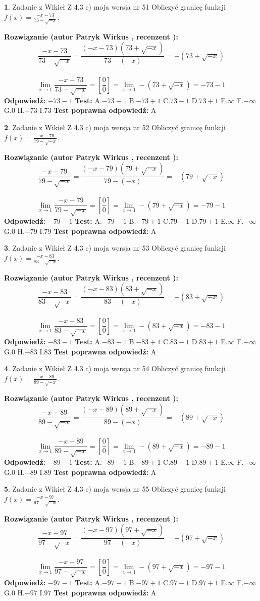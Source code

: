 \documentclass[12pt, a4paper]{article}
\theoremstyle{definition} %
\newtheorem{zad}{}
\newcommand{\zadStart}[1]{\begin{zad}#1\newline}
\newcommand{\zadStop}{\end{zad}}
\newcommand{\rozwStart}[2]{\noindent \textbf{Rozwiązanie (autor #1 , recenzent #2): }\newline}
\newcommand{\rozwStop}{\newline}
\newcommand{\odpStart}{\noindent \textbf{Odpowiedź:}\newline}
\newcommand{\odpStop}{\newline}
\newcommand{\testStart}{\noindent \textbf{Test:}\newline}
\newcommand{\testStop}{\newline}
\newcommand{\kluczStart}{\noindent \textbf{Test poprawna odpowiedź:}\newline}
\newcommand{\kluczStop}{\newline}
\begin{document}
\zadStart{Zadanie z Wikieł Z 4.3 c) moja wersja nr 51}
Obliczyć granicę funkcji $f(x)=\frac{-x-73}{73-\sqrt{-x}}$.
\zadStop
\rozwStart{Patryk Wirkus}{}
$$\frac{-x-73}{73-\sqrt{-x}}=\frac{(-x-73)(73+\sqrt{-x})}{73-(-x)}=-(73+\sqrt{-x})$$
\\
$$\lim\limits_{x\to1}\frac{-x-73}{73-\sqrt{-x}}=[\frac{0}{0}]=\lim\limits_{x\to1}-(73+\sqrt{-x}) =-73-1$$
\rozwStop
\odpStart
$-73-1$
\odpStop
\testStart
A.$-73-1$
B.$-73+1$
C.$73-1$
D.$73+1$
E.$\infty$
F.$-\infty$
G.$0$
H.$-73$
I.$73$
\testStop
\kluczStart
A
\kluczStop



\zadStart{Zadanie z Wikieł Z 4.3 c) moja wersja nr 52}
Obliczyć granicę funkcji $f(x)=\frac{-x-79}{79-\sqrt{-x}}$.
\zadStop
\rozwStart{Patryk Wirkus}{}
$$\frac{-x-79}{79-\sqrt{-x}}=\frac{(-x-79)(79+\sqrt{-x})}{79-(-x)}=-(79+\sqrt{-x})$$
\\
$$\lim\limits_{x\to1}\frac{-x-79}{79-\sqrt{-x}}=[\frac{0}{0}]=\lim\limits_{x\to1}-(79+\sqrt{-x}) =-79-1$$
\rozwStop
\odpStart
$-79-1$
\odpStop
\testStart
A.$-79-1$
B.$-79+1$
C.$79-1$
D.$79+1$
E.$\infty$
F.$-\infty$
G.$0$
H.$-79$
I.$79$
\testStop
\kluczStart
A
\kluczStop



\zadStart{Zadanie z Wikieł Z 4.3 c) moja wersja nr 53}
Obliczyć granicę funkcji $f(x)=\frac{-x-83}{83-\sqrt{-x}}$.
\zadStop
\rozwStart{Patryk Wirkus}{}
$$\frac{-x-83}{83-\sqrt{-x}}=\frac{(-x-83)(83+\sqrt{-x})}{83-(-x)}=-(83+\sqrt{-x})$$
\\
$$\lim\limits_{x\to1}\frac{-x-83}{83-\sqrt{-x}}=[\frac{0}{0}]=\lim\limits_{x\to1}-(83+\sqrt{-x}) =-83-1$$
\rozwStop
\odpStart
$-83-1$
\odpStop
\testStart
A.$-83-1$
B.$-83+1$
C.$83-1$
D.$83+1$
E.$\infty$
F.$-\infty$
G.$0$
H.$-83$
I.$83$
\testStop
\kluczStart
A
\kluczStop



\zadStart{Zadanie z Wikieł Z 4.3 c) moja wersja nr 54}
Obliczyć granicę funkcji $f(x)=\frac{-x-89}{89-\sqrt{-x}}$.
\zadStop
\rozwStart{Patryk Wirkus}{}
$$\frac{-x-89}{89-\sqrt{-x}}=\frac{(-x-89)(89+\sqrt{-x})}{89-(-x)}=-(89+\sqrt{-x})$$
\\
$$\lim\limits_{x\to1}\frac{-x-89}{89-\sqrt{-x}}=[\frac{0}{0}]=\lim\limits_{x\to1}-(89+\sqrt{-x}) =-89-1$$
\rozwStop
\odpStart
$-89-1$
\odpStop
\testStart
A.$-89-1$
B.$-89+1$
C.$89-1$
D.$89+1$
E.$\infty$
F.$-\infty$
G.$0$
H.$-89$
I.$89$
\testStop
\kluczStart
A
\kluczStop



\zadStart{Zadanie z Wikieł Z 4.3 c) moja wersja nr 55}
Obliczyć granicę funkcji $f(x)=\frac{-x-97}{97-\sqrt{-x}}$.
\zadStop
\rozwStart{Patryk Wirkus}{}
$$\frac{-x-97}{97-\sqrt{-x}}=\frac{(-x-97)(97+\sqrt{-x})}{97-(-x)}=-(97+\sqrt{-x})$$
\\
$$\lim\limits_{x\to1}\frac{-x-97}{97-\sqrt{-x}}=[\frac{0}{0}]=\lim\limits_{x\to1}-(97+\sqrt{-x}) =-97-1$$
\rozwStop
\odpStart
$-97-1$
\odpStop
\testStart
A.$-97-1$
B.$-97+1$
C.$97-1$
D.$97+1$
E.$\infty$
F.$-\infty$
G.$0$
H.$-97$
I.$97$
\testStop
\kluczStart
A
\kluczStop
\end{document}
